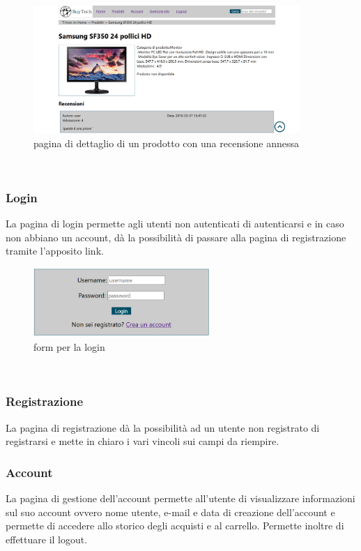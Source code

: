 \begin{figure}[h!]
	\label{dettaglio} 
	\centering 
	\includegraphics[width=0.9\textwidth]{immagini/dettaglio.png}
	\caption{pagina di dettaglio di un prodotto con una recensione annessa} 
\end{figure}
\mbox{} \\

\subsubsection{Login}
La pagina di login permette agli utenti non autenticati di autenticarsi e in caso non abbiano un account, dà la possibilità di passare alla pagina di registrazione tramite l'apposito link.

\begin{figure}[h!]
	\label{login} 
	\centering 
	\includegraphics[width=0.6\textwidth]{immagini/login.png}
	\caption{form per la login} 
\end{figure}
\mbox{} \\

\subsubsection{Registrazione}
La pagina di registrazione dà la possibilità ad un utente non registrato di registrarsi e mette in chiaro i vari vincoli sui campi da riempire.

\subsubsection{Account}
La pagina di gestione dell'account permette all'utente di visualizzare informazioni sul suo account ovvero nome utente, e-mail e data di creazione dell'account e permette di accedere allo storico degli acquisti e al carrello.\newline
Permette inoltre di effettuare il logout.

